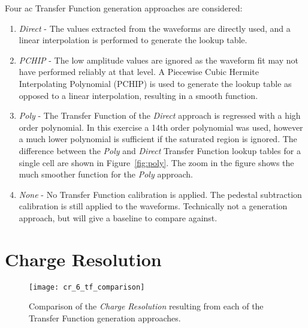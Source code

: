 Four \gls{ac} Transfer Function generation approaches are considered:
\begin{enumerate}
\item \textit{Direct} - The values extracted from the waveforms are directly used, and a linear interpolation is performed to generate the lookup table.
\item \textit{PCHIP} - The low amplitude values are ignored as the waveform fit may not have performed reliably at that level. A Piecewise Cubic Hermite Interpolating Polynomial (PCHIP) is used to generate the lookup table as opposed to a linear interpolation, resulting in a smooth function.
\item \textit{Poly} - The Transfer Function of the \textit{Direct} approach is regressed with a high order polynomial. In this exercise a 14th order polynomial was used, however a much lower polynomial is sufficient if the saturated region is ignored. The difference between the \textit{Poly} and \textit{Direct} Transfer Function lookup tables for a single cell are shown in Figure~\ref{fig:poly}. The zoom in the figure shows the much smoother function for the \textit{Poly} approach.
\item \textit{None} - No Transfer Function calibration is applied. The pedestal subtraction calibration is still applied to the waveforms. Technically not a generation approach, but will give a baseline to compare against.
\end{enumerate}

\section{Charge Resolution}

\begin{figure}
	\centering
	\texttt{[image: cr\_6\_tf\_comparison]} 
	\caption[Comparison of the \textit{Charge Resolution} resulting from each of the Transfer Function generation approaches.]{Comparison of the \textit{Charge Resolution} resulting from each of the Transfer Function generation approaches.} 
	\label{fig:cr_6_tf_comparison}
\end{figure}

